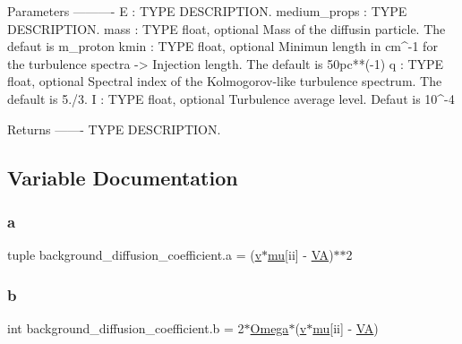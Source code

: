 \begin{DoxyVerb}Parameters
----------
E : TYPE
    DESCRIPTION.
medium_props : TYPE
    DESCRIPTION.
mass : TYPE float, optional
    Mass of the diffusin particle. The defaut is m_proton
kmin : TYPE float, optional
    Minimun length in cm^-1 for the turbulence spectra -> Injection length. The default is 50pc**(-1)
q : TYPE float, optional
    Spectral index of the Kolmogorov-like turbulence 
    spectrum. The default is 5./3.
I : TYPE float, optional
    Turbulence average level. Defaut is 10^-4

Returns
-------
TYPE
    DESCRIPTION.\end{DoxyVerb}
 

\subsection{Variable Documentation}
\mbox{\label{namespacebackground__diffusion__coefficient_a136aa61656385e49855d586138d39374}} 
\subsubsection{\texorpdfstring{a}{a}}
{\footnotesize\ttfamily tuple background\+\_\+diffusion\+\_\+coefficient.\+a = (\hyperlink{namespacebackground__diffusion__coefficient_ae9abae81fd1c7196ed03b7e5a0addbd2}{v}$\ast$\hyperlink{namespacebackground__diffusion__coefficient_aff54de3ac975c901763d9ead73135baf}{mu}\mbox{[}ii\mbox{]} -\/ \hyperlink{namespacebackground__diffusion__coefficient_ac633d9c84127aeb9f09cf992f56a04c5}{VA})$\ast$$\ast$2}

\mbox{\label{namespacebackground__diffusion__coefficient_a1c03ac6c07803cd1cd40a72d62e554f8}} 
\subsubsection{\texorpdfstring{b}{b}}
{\footnotesize\ttfamily int background\+\_\+diffusion\+\_\+coefficient.\+b = 2$\ast$\hyperlink{namespacebackground__diffusion__coefficient_a01702f7bd5c02645ef1e1ffb9dd228f3}{Omega}$\ast$(\hyperlink{namespacebackground__diffusion__coefficient_ae9abae81fd1c7196ed03b7e5a0addbd2}{v}$\ast$\hyperlink{namespacebackground__diffusion__coefficient_aff54de3ac975c901763d9ead73135baf}{mu}\mbox{[}ii\mbox{]} -\/ \hyperlink{namespacebackground__diffusion__coefficient_ac633d9c84127aeb9f09cf992f56a04c5}{VA})}

